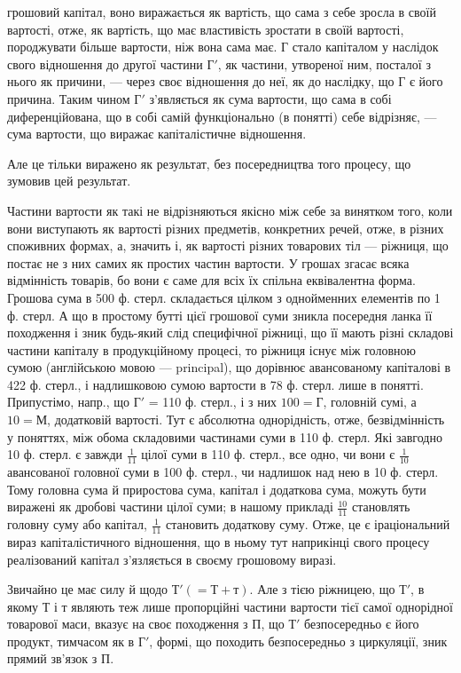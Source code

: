 \parcont{}  %
грошовий капітал, воно виражається як вартість, що сама з себе зросла
в своїй вартості, отже, як вартість, що має властивість зростати в своїй
вартості, породжувати більше вартости, ніж вона сама має. $Г$ стало капіталом
у наслідок свого відношення до другої частини $Г'$, як частини,
утвореної ним, посталої з нього як причини, — через своє відношення до
неї, як до наслідку, що $Г$ є його причина. Таким чином $Г'$ з’являється
як сума вартости, що сама в собі диференційована, що в собі самій функціонально
(в понятті) себе відрізняє, — сума вартости, що виражає капіталістичне
відношення.

Але це тільки виражено як результат, без посередництва того процесу,
що зумовив цей результат.

Частини вартости як такі не відрізняються якісно між себе за винятком
того, коли вони виступають як вартості різних предметів, конкретних
речей, отже, в різних споживних формах, а, значить і, як вартості
різних товарових тіл — ріжниця, що постає не з них самих як простих
частин вартости. У грошах згасає всяка відмінність товарів, бо вони є
саме для всіх їх спільна еквівалентна форма. Грошова сума в 500 ф.
стерл. складається цілком з однойменних елементів по 1 ф. стерл. А що
в простому бутті цієї грошової суми зникла посередня ланка її походження
і зник будь-який слід специфічної ріжниці, що її мають різні
складові частини капіталу в продукційному процесі, то ріжниця існує
між головною сумою (англійською мовою — principal), що дорівнює
авансованому капіталові в 422 ф. стерл., і надлишковою сумою вартости
в 78 ф. стерл. лише в понятті. Припустімо, напр., що $Г'$ = 110 ф. стерл.,
і з них $100 = Г$, головній сумі, а $10 = М$, додатковій вартості. Тут
є абсолютна однорідність, отже, безвідмінність у поняттях, між обома
складовими частинами суми в 110 ф. стерл. Які завгодно 10 ф. стерл.
є завжди $\frac{1}{11}$ цілої суми в 110 ф. стерл., все одно, чи вони є $\frac{1}{10}$ авансованої
головної суми в 100 ф. стерл., чи надлишок над нею в 10 ф. стерл.
Тому головна сума й приростова сума, капітал і додаткова сума, можуть
бути виражені як дробові частини цілої суми; в нашому прикладі $\frac{10}{11}$ становлять
головну суму або капітал, $\frac{1}{11}$ становить додаткову суму. Отже, це є
іраціональний вираз капіталістичного відношення, що в ньому тут наприкінці
свого процесу реалізований капітал з’язляється в своєму грошовому виразі.

Звичайно це має силу й щодо $Т' (= Т + т)$. Але з тією ріжницею, що
$Т'$, в якому $Т$ і $т$ являють теж лише пропорційні частини вартости тієї
самої однорідної товарової маси, вказує на своє походження з $П$, що $Т'$
безпосередньо є його продукт, тимчасом як в $Г'$, формі, що походить
безпосередньо з циркуляції, зник прямий зв’язок з $П$.

